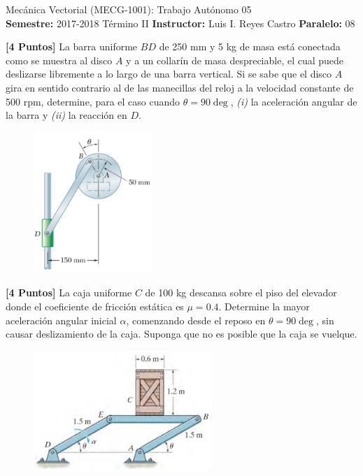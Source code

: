 \documentclass[ a4paper, twoside, 11pt]{article}
\newcommand{\numero}{05}
\begin{document}
\allowdisplaybreaks

\begin{center}
\Large Mec\'anica Vectorial (MECG-1001): Trabajo Aut\'onomo \numero \\[2ex]
\small \textbf{Semestre:} 2017-2018 T\'ermino II \qquad
\textbf{Instructor:} Luis I. Reyes Castro \qquad
\textbf{Paralelo:} 08
\end{center}
\fullskip

\begin{problem}
\textbf{[4 Puntos]} La barra uniforme $BD$ de 250 mm y 5 kg de masa est\'a conectada como se muestra al disco $A$ y a un collar\'in de masa despreciable, el cual puede deslizarse libremente a lo largo de una barra vertical. Si se sabe que el disco $A$ gira en sentido contrario al de las manecillas del reloj a la velocidad constante de 500 rpm, determine, para el caso cuando $\theta = 90\deg$, \textit{(i)} la aceleraci\'on angular de la barra y \textit{(ii)} la reacci\'on en $D$. 

\begin{figure}[htb]
\centering
\includegraphics[width=0.4\textwidth]{problema-1.jpg}
\end{figure}

\end{problem}
\fullskip

\begin{problem}
\textbf{[4 Puntos]} La caja uniforme $C$ de 100 kg descansa sobre el piso del elevador donde el coeficiente de fricci\'on est\'atica es $\mu = 0.4$. Determine la mayor aceleraci\'on angular inicial $\alpha$, comenzando desde el reposo en $\theta = 90\deg$, sin causar deslizamiento de la caja. Suponga que no es posible que la caja se vuelque. 

\begin{figure}[htb]
\centering
\includegraphics[width=0.6\textwidth]{problema-2.jpg}
\end{figure}

\end{problem}
\fullskip
\end{document}
